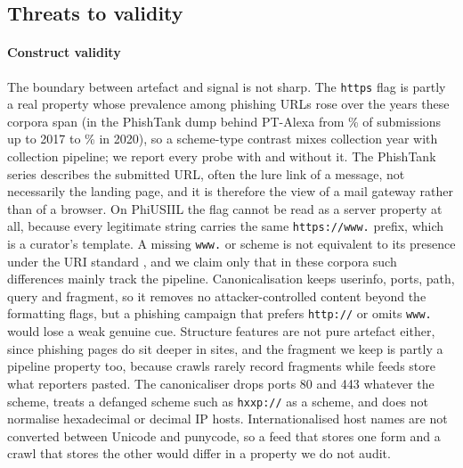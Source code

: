 \subsection{Threats to validity}
\label{sec:threats}
\paragraph{Construct validity} The boundary between artefact and signal is not sharp. The \texttt{https} flag is partly a real property whose prevalence among phishing URLs rose over the years these corpora span (in the PhishTank dump behind PT-Alexa from \PTHttpsEarly\% of submissions up to 2017 to \PTHttpsTwenty\% in 2020), so a scheme-type contrast mixes collection year with collection pipeline; we report every probe with and without it. The PhishTank series describes the submitted URL, often the lure link of a message, not necessarily the landing page, and it is therefore the view of a mail gateway rather than of a browser. On PhiUSIIL the flag cannot be read as a server property at all, because every legitimate string carries the same \texttt{https://www.} prefix, which is a curator's template. A missing \texttt{www.} or scheme is not equivalent to its presence under the URI standard \citep{rfc3986}, and we claim only that in these corpora such differences mainly track the pipeline. Canonicalisation keeps userinfo, ports, path, query and fragment, so it removes no attacker-controlled content beyond the formatting flags, but a phishing campaign that prefers \texttt{http://} or omits \texttt{www.} would lose a weak genuine cue. Structure features are not pure artefact either, since phishing pages do sit deeper in sites, and the fragment we keep is partly a pipeline property too, because crawls rarely record fragments while feeds store what reporters pasted. The canonicaliser drops ports 80 and 443 whatever the scheme, treats a defanged scheme such as \texttt{hxxp://} as a scheme, and does not normalise hexadecimal or decimal IP hosts. Internationalised host names are not converted between Unicode and punycode, so a feed that stores one form and a crawl that stores the other would differ in a property we do not audit.

